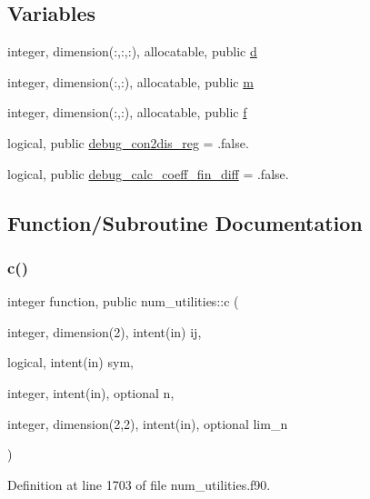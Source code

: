 \subsection*{Variables}
\begin{DoxyCompactItemize}
\item 
integer, dimension(\+:,\+:,\+:), allocatable, public \hyperlink{namespacenum__utilities_a763215553acfcc054b1ec1bc207a1793}{d}
\item 
integer, dimension(\+:,\+:), allocatable, public \hyperlink{namespacenum__utilities_ad7a7ae2abf02a2df9e00b2aca669617c}{m}
\item 
integer, dimension(\+:,\+:), allocatable, public \hyperlink{namespacenum__utilities_a8e3399292fcb3a5fc35ae87f7811bbb5}{f}
\item 
logical, public \hyperlink{namespacenum__utilities_ab7138a230a3c494c7a2b71b2a7fffc0a}{debug\+\_\+con2dis\+\_\+reg} = .false.
\item 
logical, public \hyperlink{namespacenum__utilities_ae20985c8049d39f987fa23d728688cbc}{debug\+\_\+calc\+\_\+coeff\+\_\+fin\+\_\+diff} = .false.
\end{DoxyCompactItemize}


\subsection{Function/\+Subroutine Documentation}
\mbox{\label{namespacenum__utilities_a5ee3fbd1fe67d0deefc7194631389f2a}} 
\subsubsection{\texorpdfstring{c()}{c()}}
{\footnotesize\ttfamily integer function, public num\+\_\+utilities\+::c (\begin{DoxyParamCaption}\item[{integer, dimension(2), intent(in)}]{ij,  }\item[{logical, intent(in)}]{sym,  }\item[{integer, intent(in), optional}]{n,  }\item[{integer, dimension(2,2), intent(in), optional}]{lim\+\_\+n }\end{DoxyParamCaption})}



Definition at line 1703 of file num\+\_\+utilities.\+f90.

